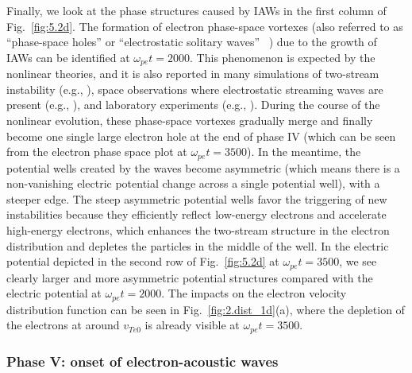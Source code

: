 \documentclass[%
 reprint,
 amsmath,
 amssymb,
 aps,
 prx,
floatfix,
superscriptaddress
]{revtex4-2}
\begin{document}
Finally, we look at the phase structures caused by IAWs in the first column of Fig.~\ref{fig:5.2d}.
The formation of electron phase-space vortexes (also referred to as ``phase-space holes'' or ``electrostatic solitary waves'' ~\cite{hutchinson2017electron}) due to the growth of IAWs can be identified at $\omega_{pe}t = 2000$.
This phenomenon is expected by the nonlinear theories, and it is also reported in many simulations of two-stream instability (e.g., \cite{morse1969one, berk1970phase}), space observations where electrostatic streaming waves are present (e.g., \cite{malaspina2013electrostatic, pickett2008furthering, Mozer2020b}), and laboratory experiments (e.g., \cite{saeki1979formation}). 
During the course of the nonlinear evolution, these phase-space vortexes gradually merge and finally become one single large electron hole at the end of phase IV (which can be seen from the electron phase space plot at $\omega_{pe}t = 3500$). 
In the meantime, the potential wells created by the waves become asymmetric (which means there is a non-vanishing electric potential change across a single potential well), with a steeper edge.
The steep asymmetric potential wells favor the triggering of new instabilities because they efficiently reflect low-energy electrons and accelerate high-energy electrons, which enhances the two-stream structure in the electron distribution and depletes the particles in the middle of the well.
In the electric potential depicted in the second row of Fig.~\ref{fig:5.2d} at $\omega_{pe}t=3500$, we see clearly larger and more asymmetric potential structures compared with the electric potential at $\omega_{pe}t=2000$.
The impacts on the electron velocity distribution function can be seen in Fig.~\ref{fig:2.dist_1d}(a), where the depletion of the electrons at around $v_{Te0}$ is already visible at $\omega_{pe}t =3500$. 


\subsubsection{\label{sec:phase5}Phase V: onset of electron-acoustic waves} 
\end{document}
